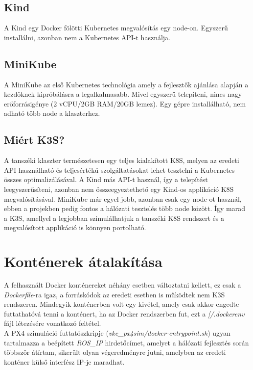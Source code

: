 \subsection{Kind}

A Kind egy Docker fölötti Kubernetes megvalósítás egy node-on. Egyszerű installálni, azonban nem a Kubernetes API-t használja.

\subsection{MiniKube}

A MiniKube az első Kubernetes technológia amely a fejlesztők ajánlása alapján a kezdőknek kipróbálásra a legalkalmasabb. Mivel egyszerű telepíteni, nincs nagy erőforrásigénye (2 vCPU/2GB RAM/20GB lemez). Egy gépre installálható, nem adható több node a klaszterhez. \cite{typesofkubernetes2}

\subsection{Miért K3S?}

A tanszéki klaszter természetesen egy teljes kialakított K8S, melyen az eredeti API használható és teljesértékű szolgáltatásokat lehet tesztelni a Kubernetes összes optimalizálásával. A Kind más API-t használ, így a telepítést leegyszerűsíteni, azonban nem összeegyeztethető egy Kind-os applikáció K8S megvalósításával. MiniKube már egyel jobb, azonban csak egy node-ot használ, ebben a projekben pedig fontos a hálózati tesztelés több node között. Így marad a K3S, amellyel a legjobban szimulálhatjuk a tanszéki K8S rendszert és a megvalósított applikáció is könnyen portolható.

\section{Konténerek átalakítása}

A felhasznált Docker konténereket néhány esetben változtatni kellett, ez csak a \emph{Dockerfile}-ra igaz, a forráskódok az eredeti esetben is működtek nem K3S rendszeren. Mindegyik konténerben volt egy kivétel, amely csak akkor engedte futtathatóvá tenni a konténert, ha az Docker rendszerben fut, ezt a \emph{[/.dockerenv} fájl létezésére vonatkozó feltétel. \\

\noindent
A PX4 szimuláció futtatószkripje (\emph{vke\_px4sim/docker-entrypoint.sh}) ugyan tartalmazza a beépített \emph{ROS\_IP} hirdetőcímet, amelyet a hálózati fejlesztés során többször átírtam, sikerült olyan végeredményre jutni, amelyben az eredeti konténer külső interfész IP-je maradhat. \\

